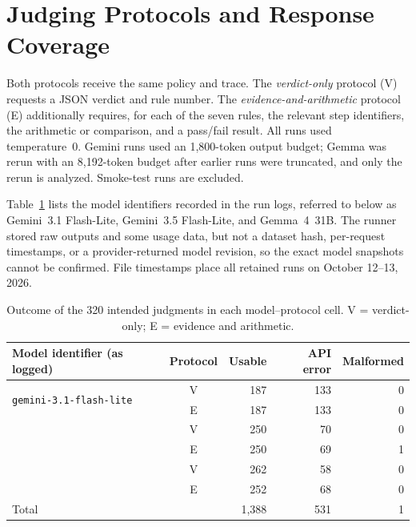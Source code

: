 \documentclass[11pt,letterpaper]{article}
\begin{document}
\section{Judging Protocols and Response Coverage}

Both protocols receive the same policy and trace. The \emph{verdict-only} protocol (V) requests a JSON verdict and rule number. The \emph{evidence-and-arithmetic} protocol (E) additionally requires, for each of the seven rules, the relevant step identifiers, the arithmetic or comparison, and a pass/fail result. All runs used temperature~0. Gemini runs used an 1,800-token output budget; Gemma was rerun with an 8,192-token budget after earlier runs were truncated, and only the rerun is analyzed. Smoke-test runs are excluded.

Table~\ref{tab:coverage} lists the model identifiers recorded in the run logs, referred to below as Gemini~3.1 Flash-Lite, Gemini~3.5 Flash-Lite, and Gemma~4~31B. The runner stored raw outputs and some usage data, but not a dataset hash, per-request timestamps, or a provider-returned model revision, so the exact model snapshots cannot be confirmed. File timestamps place all retained runs on October 12--13, 2026.

\begin{table}[ht]
\centering
\small
\begin{tabular}{@{}l c r r r@{}}
\toprule
Model identifier (as logged) & Protocol & Usable & API error & Malformed \\
\midrule
\multirow{2}{*}{\texttt{gemini-3.1-flash-lite}} & V & 187 & 133 & 0 \\
                                                & E & 187 & 133 & 0 \\
\addlinespace
\multirow{2}{*}{\texttt{gemini-3.5-flash-lite}} & V & 250 & 70 & 0 \\
                                                & E & 250 & 69 & 1 \\
\addlinespace
\multirow{2}{*}{\texttt{gemma-4-31b-it}}        & V & 262 & 58 & 0 \\
                                                & E & 252 & 68 & 0 \\
\midrule
Total & & 1,388 & 531 & 1 \\
\bottomrule
\end{tabular}
\caption{Outcome of the 320 intended judgments in each model--protocol cell. V = verdict-only; E = evidence and arithmetic.}
\label{tab:coverage}
\end{table}
\end{document}
